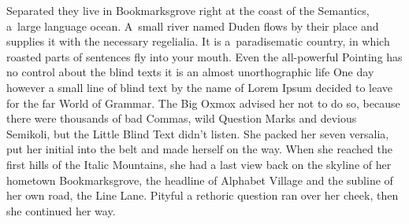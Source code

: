 \documentclass[12pt, a4paper, oneside]{article}
\theoremstyle{Plain}
\theoremstyle{Definition}
\theoremstyle{Remark}
\begin{document}
Separated they live in Bookmarksgrove right at the coast of the Semantics, a~large language ocean. A~small river named Duden flows by their place and supplies it with the necessary regelialia. It is a~paradisematic country, in which roasted parts of sentences fly into your mouth. Even the all-powerful Pointing has no control about the blind texts it is an almost unorthographic life One day however a small line of blind text by the name of Lorem Ipsum decided to leave for the far World of Grammar. The Big Oxmox advised her not to do so, because there were thousands of bad Commas, wild Question Marks and devious Semikoli, but the Little Blind Text didn't listen. She packed her seven versalia, put her initial into the belt and made herself on the way. When she reached the first hills of the Italic Mountains, she had a last view back on the skyline of her hometown Bookmarksgrove, the headline of Alphabet Village and the subline of her own road, the Line Lane. Pityful a rethoric question ran over her cheek, then she continued her way.%
\end{document}
